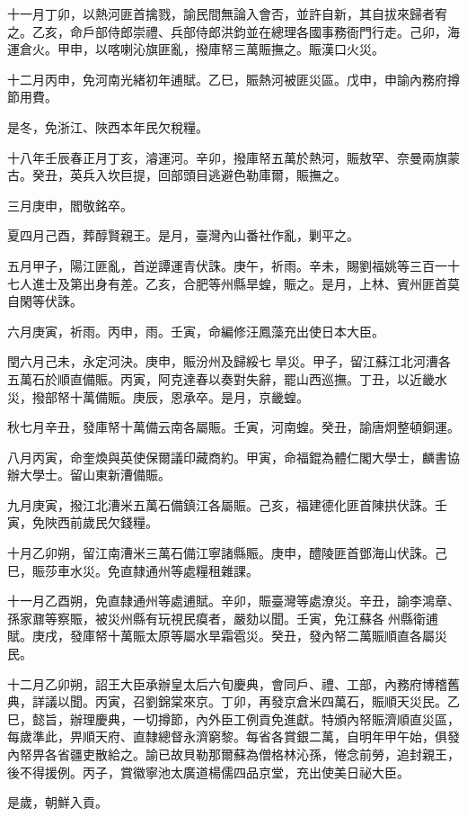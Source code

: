 \begin{pinyinscope}
十一月丁卯，以熱河匪首擒戮，諭民間無論入會否，並許自新，其自拔來歸者宥之。乙亥，命戶部侍郎崇禮、兵部侍郎洪鈞並在總理各國事務衙門行走。己卯，海運倉火。甲申，以喀喇沁旗匪亂，撥庫帑三萬賑撫之。賑漢口火災。

十二月丙申，免河南光緒初年逋賦。乙巳，賑熱河被匪災區。戊申，申諭內務府撙節用費。

是冬，免浙江、陜西本年民欠稅糧。

十八年壬辰春正月丁亥，濬運河。辛卯，撥庫帑五萬於熱河，賑敖罕、奈曼兩旗蒙古。癸丑，英兵入坎巨提，回部頭目逃避色勒庫爾，賑撫之。

三月庚申，閻敬銘卒。

夏四月己酉，葬醇賢親王。是月，臺灣內山番社作亂，剿平之。

五月甲子，陽江匪亂，首逆譚運青伏誅。庚午，祈雨。辛未，賜劉福姚等三百一十七人進士及第出身有差。乙亥，合肥等州縣旱蝗，賑之。是月，上林、賓州匪首莫自閑等伏誅。

六月庚寅，祈雨。丙申，雨。壬寅，命編修汪鳳藻充出使日本大臣。

閏六月己未，永定河決。庚申，賑汾州及歸綏七旱災。甲子，留江蘇江北河漕各五萬石於順直備賑。丙寅，阿克達春以奏對失辭，罷山西巡撫。丁丑，以近畿水災，撥部帑十萬備賑。庚辰，恩承卒。是月，京畿蝗。

秋七月辛丑，發庫帑十萬備云南各屬賑。壬寅，河南蝗。癸丑，諭唐炯整頓銅運。

八月丙寅，命奎煥與英使保爾議印藏商約。甲寅，命福錕為體仁閣大學士，麟書協辦大學士。留山東新漕備賑。

九月庚寅，撥江北漕米五萬石備鎮江各屬賑。己亥，福建德化匪首陳拱伏誅。壬寅，免陜西前歲民欠錢糧。

十月乙卯朔，留江南漕米三萬石備江寧諸縣賑。庚申，醴陵匪首鄧海山伏誅。己巳，賑莎車水災。免直隸通州等處糧租雜課。

十一月乙酉朔，免直隸通州等處逋賦。辛卯，賑臺灣等處潦災。辛丑，諭李鴻章、孫家鼐等察賑，被災州縣有玩視民瘼者，嚴劾以聞。壬寅，免江蘇各州縣衛逋賦。庚戌，發庫帑十萬賑太原等屬水旱霜雹災。癸丑，發內帑二萬賑順直各屬災民。

十二月乙卯朔，詔王大臣承辦皇太后六旬慶典，會同戶、禮、工部，內務府博稽舊典，詳議以聞。丙寅，召劉錦棠來京。丁卯，再發京倉米四萬石，賑順天災民。乙巳，懿旨，辦理慶典，一切撙節，內外臣工例貢免進獻。特頒內帑賑濟順直災區，每歲準此，畀順天府、直隸總督永濟窮黎。每省各賞銀二萬，自明年甲午始，俱發內帑畀各省疆吏散給之。諭已故貝勒那爾蘇為僧格林沁孫，惓念前勞，追封親王，後不得援例。丙子，賞徽寧池太廣道楊儒四品京堂，充出使美日祕大臣。

是歲，朝鮮入貢。


\end{pinyinscope}
